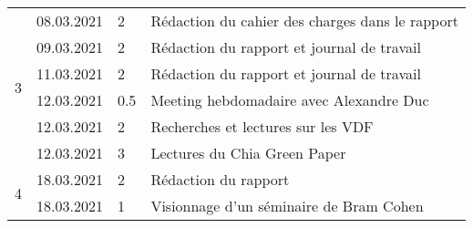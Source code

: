 \begin{longtable}[c]{l l l p{8.2cm}}
	\multirow{6}{*}{3}
	& 08.03.2021
	& 2
	& Rédaction du cahier des charges dans le rapport \\
	
	& 09.03.2021
	& 2
	& Rédaction du rapport et journal de travail \\
	
	& 11.03.2021
	& 2
	& Rédaction du rapport et journal de travail \\
	
	& 12.03.2021
	& 0.5
	& Meeting hebdomadaire avec Alexandre Duc \\
	
	& 12.03.2021
	& 2
	& Recherches et lectures sur les VDF \\
	
	& 12.03.2021
	& 3
	& Lectures du Chia Green Paper \\
	
	\hline
	
	\multirow{2}{*}{4}
	& 18.03.2021
	& 2
	& Rédaction du rapport \\
	
	& 18.03.2021
	& 1
	& Visionnage d'un séminaire de Bram Cohen \\
	
\end{longtable}
\egroup